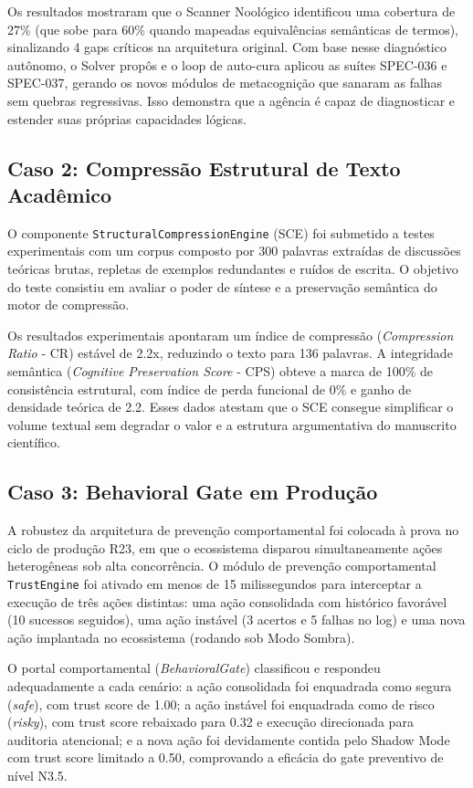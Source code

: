 \documentclass[12pt,a4paper,oneside]{abntex2}
\begin{document}
Os resultados mostraram que o Scanner Noológico identificou uma cobertura de 27\% (que sobe para 60\% quando mapeadas equivalências semânticas de termos), sinalizando 4 gaps críticos na arquitetura original. Com base nesse diagnóstico autônomo, o Solver propôs e o loop de auto-cura aplicou as suítes SPEC-036 e SPEC-037, gerando os novos módulos de metacognição que sanaram as falhas sem quebras regressivas. Isso demonstra que a agência é capaz de diagnosticar e estender suas próprias capacidades lógicas.

\subsection{Caso 2: Compressão Estrutural de Texto Acadêmico}

O componente \texttt{StructuralCompressionEngine} (SCE) foi submetido a testes experimentais com um corpus composto por 300 palavras extraídas de discussões teóricas brutas, repletas de exemplos redundantes e ruídos de escrita. O objetivo do teste consistiu em avaliar o poder de síntese e a preservação semântica do motor de compressão.

Os resultados experimentais apontaram um índice de compressão (\textit{Compression Ratio} - CR) estável de 2.2x, reduzindo o texto para 136 palavras. A integridade semântica (\textit{Cognitive Preservation Score} - CPS) obteve a marca de 100\% de consistência estrutural, com índice de perda funcional de 0\% e ganho de densidade teórica de 2.2. Esses dados atestam que o SCE consegue simplificar o volume textual sem degradar o valor e a estrutura argumentativa do manuscrito científico.

\subsection{Caso 3: Behavioral Gate em Produção}

A robustez da arquitetura de prevenção comportamental foi colocada à prova no ciclo de produção R23, em que o ecossistema disparou simultaneamente ações heterogêneas sob alta concorrência. O módulo de prevenção comportamental \texttt{TrustEngine} foi ativado em menos de 15 milissegundos para interceptar a execução de três ações distintas: uma ação consolidada com histórico favorável (10 sucessos seguidos), uma ação instável (3 acertos e 5 falhas no log) e uma nova ação implantada no ecossistema (rodando sob Modo Sombra).

O portal comportamental (\textit{BehavioralGate}) classificou e respondeu adequadamente a cada cenário: a ação consolidada foi enquadrada como segura (\textit{safe}), com trust score de 1.00; a ação instável foi enquadrada como de risco (\textit{risky}), com trust score rebaixado para 0.32 e execução direcionada para auditoria atencional; e a nova ação foi devidamente contida pelo Shadow Mode com trust score limitado a 0.50, comprovando a eficácia do gate preventivo de nível N3.5.
\end{document}
